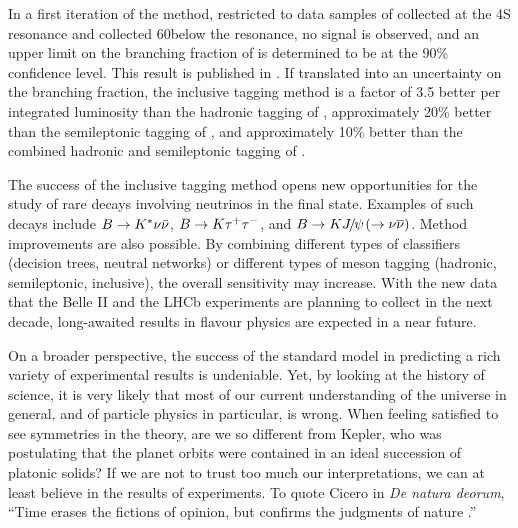 In a first iteration of the method, restricted to data samples of \lumionpartial collected at the \Y4S resonance and \lumioffpartial collected 60\mev below the resonance, no signal is observed, and an upper limit on the branching fraction of \BKpnn is determined to be \limitKppartial at the 90\% confidence level.
This result is published in \cite{Belle-II:2021rof}.
If translated into an uncertainty on the branching fraction,  the inclusive tagging method is a factor of 3.5 better per integrated luminosity than the hadronic tagging of \cite{Belle:2013tnz}, approximately 20\% better than the semileptonic tagging of \cite{Belle:2017oht}, and approximately 10\% better than the combined hadronic and semileptonic tagging of \cite{BaBar:2013npw}.

The success of the inclusive tagging method opens new opportunities for the study of rare decays involving neutrinos in the final state.
Examples of such decays include $B\rightarrow K^*\nu\bar{\nu}$, $B\rightarrow K\tau^+\tau^-$, and $B\rightarrow K{J\mskip -3mu/\mskip -2mu\psi\mskip 2mu}(\rightarrow\nu{\overline{\nu}})$.
Method improvements are also possible.
By combining different types of classifiers (decision trees, neutral networks) or different types of \B meson tagging (hadronic, semileptonic, inclusive), the overall sensitivity may increase.
With the new data that the Belle II and the LHCb experiments are planning to collect in the next decade, long-awaited results in flavour physics are expected in a near future.

On a broader perspective, the success of the standard model in predicting a rich variety of experimental results is undeniable.
Yet, by looking at the history of science, it is very likely that most of our current understanding of the universe in general, and of particle physics in particular, is wrong.
When feeling satisfied to see symmetries in the theory, are we so different from Kepler, who was postulating that the planet orbits were contained in an ideal succession of platonic solids?
If we are not to trust too much our interpretations, we can at least believe in the results of experiments.
To quote Cicero in \textit{De natura deorum}, ``Time erases the fictions of opinion, but confirms the judgments of nature \cite{cicero}.''
